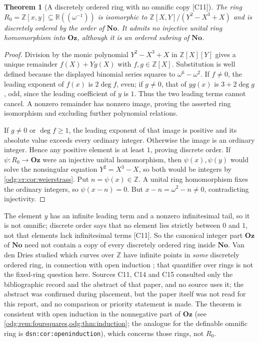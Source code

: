 \documentclass[11pt,oneside]{article}
\numberwithin{equation}{section}
\newtheorem{theorem}{Theorem}[section]
\theoremstyle{definition}
\theoremstyle{remark}
\newcommand{\No}{\mathbf{No}}
\newcommand{\Oz}{\mathbf{Oz}}
\newcommand{\Z}{\mathbb Z}
\newcommand{\R}{\mathbb R}
\newcommand{\src}[1]{\textup{\textsf{\small[#1]}}}
\newcommand{\replabel}[1]{\nolinkurl{#1}}
\begin{document}
\begin{theorem}[A discretely ordered ring with no omnific copy \src{C11}]\label{odg:cr:thm:dor}
The ring $R_0=\Z[x,y]\subseteq\R((\omega^{-1}))$ is isomorphic to
$\Z[X,Y]/(Y^2-X^3+X)$ and is discretely ordered by the order of $\No$. It admits no
injective unital ring homomorphism into $\Oz$, although it is an ordered subring of
$\No$.
\end{theorem}
\begin{proof}
Division by the monic polynomial $Y^2-X^3+X$ in $\Z[X][Y]$ gives a
unique remainder $f(X)+Yg(X)$ with $f,g\in\Z[X]$. Substitution is
well defined because the displayed binomial series squares to
$\omega^6-\omega^2$. If $f\ne0$, the leading exponent of $f(x)$ is
$2\deg f$, even; if $g\ne0$, that of $yg(x)$ is $3+2\deg g$, odd,
since the leading coefficient of $y$ is $1$. Thus the two leading terms
cannot cancel. A nonzero remainder has nonzero image, proving the
asserted ring isomorphism and excluding further polynomial relations.

If $g\ne0$ or $\deg f\ge1$, the leading exponent of that image is
positive and its absolute value exceeds every ordinary integer. Otherwise
the image is an ordinary integer. Hence any positive element is at least
$1$, proving discrete order. If $\psi:R_0\to\Oz$ were an injective unital homomorphism, then
$\psi(x),\psi(y)$ would solve the nonsingular equation $Y^2=X^3-X$, so both would be
integers by \cref{odg:cr:cor:weierstrass}. Put $n=\psi(x)\in\Z$.
A unital ring homomorphism fixes the ordinary integers, so
$\psi(x-n)=0$. But $x-n=\omega^2-n\ne0$, contradicting injectivity.
\end{proof}

The element $y$ has an infinite leading term and a nonzero infinitesimal tail, so it is
not omnific; discrete order says that no element lies strictly between $0$ and $1$, not
that elements lack infinitesimal terms \src{C11}. So the canonical integer part $\Oz$ of
$\No$ need not contain a copy of every discretely ordered ring inside $\No$. Van den
Dries studied which curves over $\Z$ have infinite points in \emph{some} discretely
ordered ring, in connection with open induction \cite{vdDries}; that quantifier over
rings is not the fixed-ring question here. Sources C11, C14 and C15 consulted only the
bibliographic record and the abstract of that paper, and no source uses it; the
abstract was confirmed during placement, but the paper itself was not read for this
report, and no comparison or priority statement is made. The theorem is consistent
with open induction in the nonnegative part of $\Oz$ (see
\cref{odg:rem:foursquares,odg:thm:induction}; the analogue for the definable
omnific ring is \replabel{dsn:cor:openinduction}), which concerns those rings, not
$R_0$.
\end{document}
